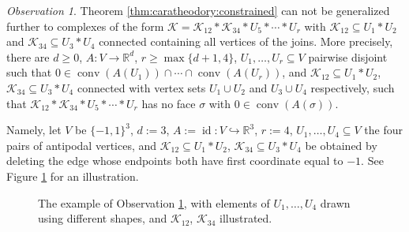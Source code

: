 \documentclass[a4paper,11pt,reqno, english]{amsart}
\theoremstyle{definition}
\theoremstyle{remark}
\newtheorem{observation}[theorem]{Observation}
\newcommand\R{\mathbb R}
\DeclareMathOperator{\id}{\mathrm{id}}
\DeclareMathOperator{\conv}{\mathrm{conv}}
\begin{document}
\begin{observation}\label{obs:no-further-grouping-in-constrained}
    Theorem \ref{thm:caratheodory:constrained} can not be generalized further to complexes of the form $\mathscr{K}=\mathscr{K}_{12}*\mathscr{K}_{34}*U_5*\cdots*U_r$ with $\mathscr{K}_{12}\subseteq U_1*U_2$ and $\mathscr{K}_{34}\subseteq U_3*U_4$ connected containing all vertices of the joins. More precisely, there are $d\geq 0$, $A:V\to\R^d$, $r\geq\max\{d+1,4\}$, $U_1,\ldots,U_r\subseteq V$ pairwise disjoint such that $0\in\conv(A(U_1))\cap\cdots\cap\conv(A(U_r))$, and $\mathscr{K}_{12}\subseteq U_1*U_2$, $\mathscr{K}_{34}\subseteq U_3*U_4$ connected with vertex sets $U_1\cup U_2$ and $U_3\cup U_4$ respectively, such that $\mathscr{K}_{12}*\mathscr{K}_{34}*U_5*\cdots*U_r$ has no face $\sigma$ with $0\in\conv(A(\sigma))$.

    Namely, let $V$ be $\{-1,1\}^3$, $d:=3$, $A:=\id\colon V\hookrightarrow\R^3$, $r:=4$, $U_1,\ldots,U_4\subseteq V$ the four pairs of antipodal vertices, and $\mathscr{K}_{12}\subseteq U_1*U_2$, $\mathscr{K}_{34}\subseteq U_3*U_4$ be obtained by deleting the edge whose endpoints both have first coordinate equal to $-1$. See Figure \ref{fig:cube} for an illustration.
    \begin{figure}[ht]
        \centering
        \caption{The example of Observation \ref{obs:no-further-grouping-in-constrained}, with elements of $U_1,\ldots,U_4$ drawn using different shapes, and $\mathscr{K}_{12}$, $\mathscr{K}_{34}$ illustrated.}
        \label{fig:cube}
    \end{figure}
\end{observation}
\end{document}
